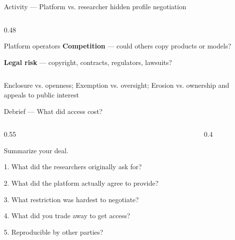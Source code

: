 \documentclass[9pt,aspectratio=169]{beamer}
\begin{document}
\begin{frame}{Activity --- Platform vs. researcher hidden profile negotiation}
\begin{columns}[T]
\begin{column}{0.48\textwidth}
\begin{alertblock}{Platform operators}
                \textbf{Competition} --- could others copy products or models?

                \medskip

                \textbf{Legal risk} --- copyright, contracts, regulators, lawsuits?
            \end{alertblock}
        \end{column}
    \end{columns}

    \bigskip
    Enclosure vs. openness; Exemption vs. oversight; Erosion vs. ownership and appeals to public interest
    
\end{frame}


\begin{frame}{Debrief --- What did access cost?}
    \begin{columns}[T]
        \begin{column}{0.55\textwidth}
        
            Summarize your deal.

            \medskip

            1. What did the researchers originally ask for?

            \medskip

            2. What did the platform actually agree to provide?

            \medskip

            3. What restriction was hardest to negotiate?

            \medskip

            4. What did you trade away to get access?

            \medskip

            5. Reproducible by other parties?

        \bigskip
        \end{column}

        \begin{column}{0.4\textwidth}

            \begin{center}
\end{center}
\end{column}
\end{columns}
\end{frame}
\end{document}
